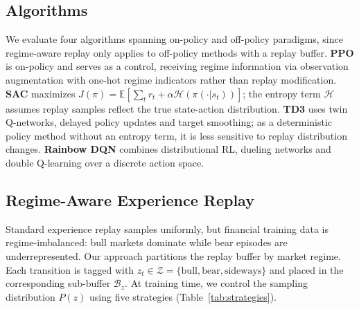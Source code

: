 \documentclass[11pt,a4paper]{article}
\begin{document}
\subsection{Algorithms}

We evaluate four algorithms spanning on-policy and off-policy paradigms, since regime-aware replay only applies to off-policy methods with a replay buffer. \textbf{PPO} \citep{schulman2017ppo} is on-policy and serves as a control, receiving regime information via observation augmentation with one-hot regime indicators \citep{nixon2025regime} rather than replay modification. \textbf{SAC} \citep{haarnoja2018sac} maximizes $J(\pi) = \mathbb{E}[\sum_t r_t + \alpha \mathcal{H}(\pi(\cdot|s_t))]$; the entropy term $\mathcal{H}$ assumes replay samples reflect the true state-action distribution. \textbf{TD3} \citep{fujimoto2018td3} uses twin Q-networks, delayed policy updates and target smoothing; as a deterministic policy method without an entropy term, it is less sensitive to replay distribution changes. \textbf{Rainbow DQN} \citep{hessel2018rainbow} combines distributional RL, dueling networks and double Q-learning over a discrete action space.


\subsection{Regime-Aware Experience Replay}

Standard experience replay \citep{mnih2015dqn} samples uniformly, but financial training data is regime-imbalanced: bull markets dominate while bear episodes are underrepresented. Our approach partitions the replay buffer by market regime. Each transition is tagged with $z_t \in \mathcal{Z} = \{\text{bull}, \text{bear}, \text{sideways}\}$ and placed in the corresponding sub-buffer $\mathcal{B}_z$. At training time, we control the sampling distribution $P(z)$ using five strategies (Table~\ref{tab:strategies}).
\end{document}
